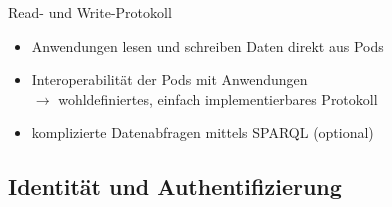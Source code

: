\begin{frame}{Read- und Write-Protokoll \footnotesize\cite{mecklerWebLinkedData2023,sambraSolidPlatformDecentralized2016}}
    \begin{itemize}
        \item Anwendungen lesen und schreiben Daten direkt aus Pods
        \item Interoperabilität der Pods mit Anwendungen\\
              $\to$ wohldefiniertes, einfach implementierbares Protokoll\\
        \item<3-> komplizierte Datenabfragen mittels SPARQL (optional)
    \end{itemize}
\end{frame}


        


\subsection{Identität und Authentifizierung}

